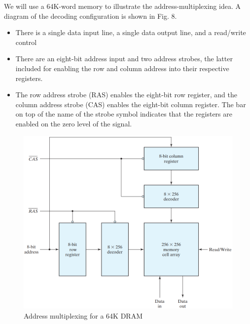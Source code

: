 We will use a 64K-word memory to illustrate the address-multiplexing idea. A diagram of the decoding configuration is shown in Fig. 8.

\begin{itemize}
  \item There is a single data input line, a single data output line, and a read/write control
  \item There are an eight-bit address input and two address strobes, the latter included for enabling the row and column address into their respective registers.
  \item The row address strobe (RAS) enables the eight-bit row register, and the column address strobe (CAS) enables the eight-bit column register. The bar on top of the name of the strobe symbol indicates that the registers are enabled on the zero level of the signal.
\end{itemize}

\vspace*{\fill}
\columnbreak

\begin{figure}[H]
  \centering
  \includegraphics[width=\linewidth]{img/fig-7.8.png}
  \caption{Address multiplexing for a 64K DRAM}
  \label{fig:7.8}
\end{figure}